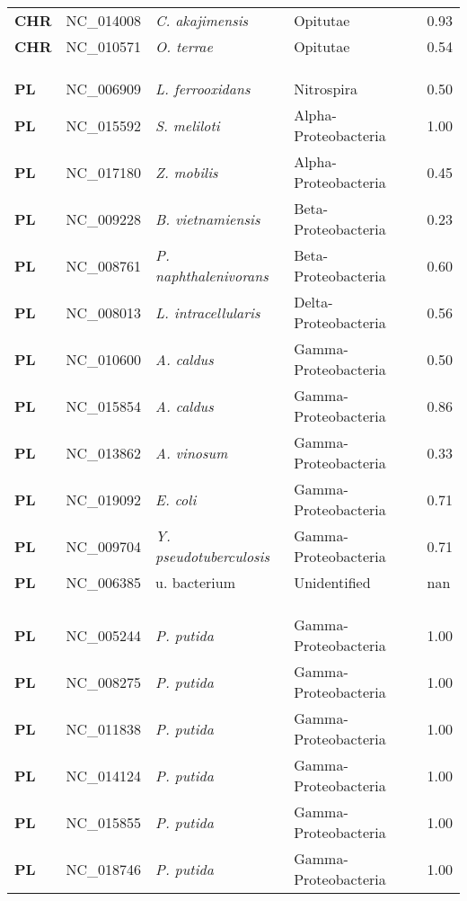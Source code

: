 \begin{adjustwidth}{-3cm}{2cm}
{\begin{supertabular}{>{\bfseries}l|p{0.1\textwidth}p{0.14\textwidth}l|l}
CHR & NC\_014008 & \textit{C. akajimensis} & Opitutae & 0.93\\
CHR & NC\_010571 & \textit{O. terrae} & Opitutae & 0.54\\
\\
\\
\hline\\
PL & NC\_006909 & \textit{L. ferrooxidans} & Nitrospira & 0.50\\
PL & NC\_015592 & \textit{S. meliloti} & Alpha-Proteobacteria & 1.00\\
PL & NC\_017180 & \textit{Z. mobilis} & Alpha-Proteobacteria & 0.45\\
PL & NC\_009228 & \textit{B. vietnamiensis} & Beta-Proteobacteria & 0.23\\
PL & NC\_008761 & \textit{P. naphthalenivorans} & Beta-Proteobacteria & 0.60\\
PL & NC\_008013 & \textit{L. intracellularis} & Delta-Proteobacteria & 0.56\\
PL & NC\_010600 & \textit{A. caldus} & Gamma-Proteobacteria & 0.50\\
PL & NC\_015854 & \textit{A. caldus} & Gamma-Proteobacteria & 0.86\\
PL & NC\_013862 & \textit{A. vinosum} & Gamma-Proteobacteria & 0.33\\
PL & NC\_019092 & \textit{E. coli} & Gamma-Proteobacteria & 0.71\\
PL & NC\_009704 & \textit{Y. pseudotuberculosis} & Gamma-Proteobacteria & 0.71\\
PL & NC\_006385 & u. bacterium & Unidentified & nan\\
\\
\\
\hline\\
PL & NC\_005244 & \textit{P. putida} & Gamma-Proteobacteria & 1.00\\
PL & NC\_008275 & \textit{P. putida} & Gamma-Proteobacteria & 1.00\\
PL & NC\_011838 & \textit{P. putida} & Gamma-Proteobacteria & 1.00\\
PL & NC\_014124 & \textit{P. putida} & Gamma-Proteobacteria & 1.00\\
PL & NC\_015855 & \textit{P. putida} & Gamma-Proteobacteria & 1.00\\
PL & NC\_018746 & \textit{P. putida} & Gamma-Proteobacteria & 1.00\\

\end{supertabular}}
\end{adjustwidth}
